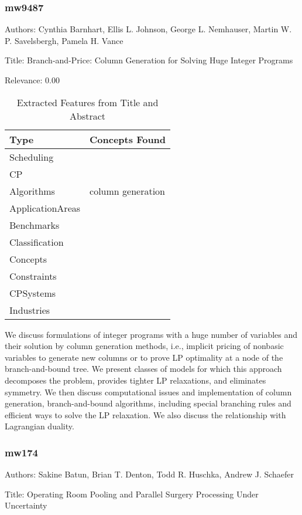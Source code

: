 \subsubsection{mw9487}
\label{mw:mw9487}

Authors: Cynthia Barnhart, Ellis L. Johnson, George L. Nemhauser, Martin W. P. Savelsbergh, Pamela H. Vance

Title: Branch-and-Price: Column Generation for Solving Huge Integer Programs

Relevance:  0.00

{\scriptsize
\begin{longtable}{p{2cm}p{20cm}}
\caption{Extracted Features from Title and Abstract}\\ \toprule
Type & Concepts Found\\ \midrule
\endhead
\bottomrule
\endfoot
Scheduling & \\ 
CP & \\ 
Algorithms & column generation\\ 
ApplicationAreas & \\ 
Benchmarks & \\ 
Classification & \\ 
Concepts & \\ 
Constraints & \\ 
CPSystems & \\ 
Industries & \\ 
\end{longtable}
}

  We discuss formulations of integer programs with a huge number of variables and their solution by column generation methods, i.e., implicit pricing of nonbasic variables to generate new columns or to prove LP optimality at a node of the branch-and-bound tree. We present classes of models for which this approach decomposes the problem, provides tighter LP relaxations, and eliminates symmetry. We then discuss computational issues and implementation of column generation, branch-and-bound algorithms, including special branching rules and efficient ways to solve the LP relaxation. We also discuss the relationship with Lagrangian duality.  

\subsubsection{mw174}
\label{mw:mw174}

Authors: Sakine Batun, Brian T. Denton, Todd R. Huschka, Andrew J. Schaefer

Title: Operating Room Pooling and Parallel Surgery Processing Under Uncertainty

